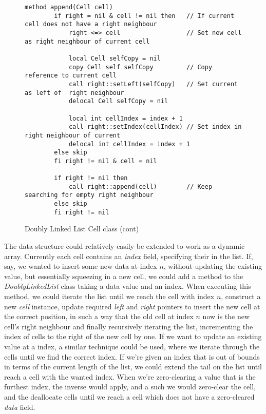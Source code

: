 \begin{figure}[ht!]
    \centering
    \begin{lstlisting}[style = basic, language = roopl]
    method append(Cell cell)
        if right = nil & cell != nil then   // If current cell does not have a right neighbour
            right <=> cell                  // Set new cell as right neighbour of current cell
        
            local Cell selfCopy = nil      
            copy Cell self selfCopy         // Copy reference to current cell
            call right::setLeft(selfCopy)   // Set current as left of  right neighbour
            delocal Cell selfCopy = nil

            local int cellIndex = index + 1
            call right::setIndex(cellIndex) // Set index in right neighbour of current
            delocal int cellIndex = index + 1
        else skip
        fi right != nil & cell = nil

        if right != nil then
            call right::append(cell)        // Keep searching for empty right neighbour
        else skip
        fi right != nil 
    \end{lstlisting}
    \caption{Doubly Linked List Cell class (cont)}
    \label{fig:doubly-linked-list-cell-class-cont}
\end{figure}

The data structure could relatively easily be extended to work as a dynamic array. Currently each cell contains an \textit{index} field, specifying their in the list. If, say, we wanted to insert some new data at index $n$, without updating the existing value, but essentially squeezing in a new cell, we could add a method to the \textit{DoublyLinkedList} class taking a data value and an index. When executing this method, we could iterate the list until we reach the cell with index $n$, construct a new \textit{cell} instance, update required \textit{left} and \textit{right} pointers to insert the new cell at the correct position, in such a way that the old cell at index $n$ now is the new cell's right neighbour and finally recursively iterating the list, incrementing the index of cells to the right of the new cell by one. If we want to update an existing value at a index, a similar technique could be used, where we iterate through the cells until we find the correct index. If we're given an index that is out of bounds in terms of the current length of the list, we could extend the tail on the list until reach a cell with the wanted index. When we're zero-clearing a value that is the furthest index, the inverse would apply, and a such we would zero-clear the cell, and the deallocate cells until we reach a cell which does not have a zero-cleared \textit{data} field. 

